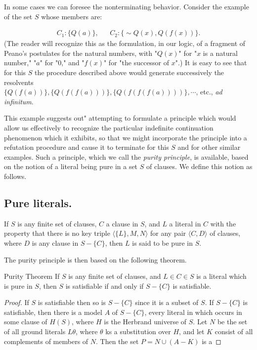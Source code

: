 \documentclass[8pt]{extarticle}
\begin{document}
In some cases we can foresee the nonterminating behavior. Consider the example of the set $S$ whose members are:

\begin{align*}
    C_1 : \{Q(a)\}, && C_2 : \{\sim Q(x), Q(f(x))\}.
\end{align*}
\noindent
(The reader will recognize this as the formulation, in our logic, of a fragment of Peano's postulates for the natural numbers, with "$Q(x)$" for "$x$ is a natural number," "$a$" for "$0$," and "$f(x)$" for "the successor of $x$".) It is easy to see that for this $S$ the procedure described above would generate successively the resolvents\\$\{Q(f(a))\},\{Q(f(f(a)))\},\{Q(f(f(f(a))))\},\dotsm$, etc., \emph{ad infinitum}.

This example suggests out" attempting to formulate a principle which would 
allow us effectively to recognize the particular indefinite continuation phenomenon which it exhibits, so that we might incorporate the principle into a refutation procedure and cause it to terminate for this $S$ and for other similar examples. Such a principle, which we call the \emph{purity principle}, is available, based on the notion of a literal being pure in a set $S$ of clauses. We define this notion as follows.

\subsection{Pure literals.}
If $S$ is any finite set of clauses, $C$ a clause in $S$, and $L$ a literal in $C$ with the property that there is no key triple $\langle\{L\}, M, N\rangle$ for any pair $\langle C,D\rangle$ of clauses, where $D$ is any clause in $S - \{C\}$, then $L$ is said to be pure in $S$.

The purity principle is then based on the following theorem. 

\begin{p15theorem}{Purity Theorem}
If $S$ is any finite set of clauses, and $L\in C\in S$ is a literal which is pure in $S$, then $S$ is satisfiable if and only if $S - \{C\}$ is satisfiable.
\end{p15theorem}
\begin{proof}
If $S$ is satisfiable then so is $S - \{C\}$ since it is a subset of $S$. If $S - \{C\}$
is satisfiable, then there is a model $A$ of $S - \{C\}$, every literal in which occurs 
in some clause of $H(S)$, where $H$ is the Herbrand universe of $S$. Let $N$ be the 
set of all ground literals $L\theta$, where $\theta$ ks a substitution over $H$, and let $K$ consist 
of all complements of members of $N$. Then the set $P = N \cup (A - K)$ is a
\end{proof}
\end{document}
